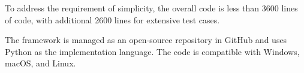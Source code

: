 To address the requirement of simplicity, the overall code is less than
3600 lines of code, with additional 2600 lines for extensive test
cases.

The framework is managed as an open-source repository in GitHub and uses
Python as the implementation language. The code is compatible with
Windows, macOS, and Linux.
